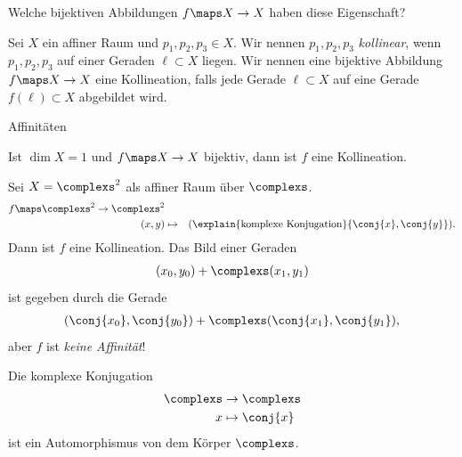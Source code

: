 \begin{frage*}
    Welche bijektiven Abbildungen \( f\maps X\to X \) haben diese Eigenschaft?
\end{frage*}
\begin{definition*}
    Sei \( X \) ein affiner Raum und \( p_1,p_2,p_3\in X \). Wir nennen \( p_1,p_2,p_3 \) \emph{kollinear}, wenn \( p_1,p_2,p_3 \) auf einer Geraden \( \ell \subset X \) liegen. Wir nennen eine bijektive Abbildung \( f\maps X\to X \) eine Kollineation, falls jede Gerade \( \ell \subset X \) auf eine Gerade \( f(\ell)\subset X \) abgebildet wird.
\end{definition*}
\begin{beispiel}
    Affinitäten
\end{beispiel}
\begin{beispiel}
    Ist \( \dim X=1 \) und \( f\maps X\to X \) bijektiv, dann ist \( f \) eine Kollineation.
\end{beispiel}
\begin{beispiel}\label{kollinieationen:beispiele:komplexe_konjugation}
    Sei \( X=\complexs^2 \) als affiner Raum über \( \complexs \).
    \begin{align*}
        f\maps \begin{aligned}[t]
            \complexs^2\to \complexs^2\\
            (x,y)&\mapsto &(\explain{\text{komplexe Konjugation}}{\conj{x},\conj{y          }}).
        \end{aligned}
    \end{align*}
    Dann ist \( f \) eine Kollineation. Das Bild einer Geraden
    \begin{align*}
        (x_0,y_0)+\complexs(x_1,y_1)
    \end{align*}
    ist gegeben durch die Gerade
    \begin{align*}
        (\conj{x_0},\conj{y_0})+\complexs(\conj{x_1},\conj{y_1}),
    \end{align*}
    aber \( f \) ist \emph{keine Affinität}!
\end{beispiel}
\begin{bemerkung*}
    Die komplexe Konjugation
    \begin{align*}
        \begin{aligned}[t]
            \complexs&\to \complexs\\
            x&\mapsto \conj{x}
        \end{aligned}
    \end{align*}
    ist ein Automorphismus von dem Körper \( \complexs \).
\end{bemerkung*}